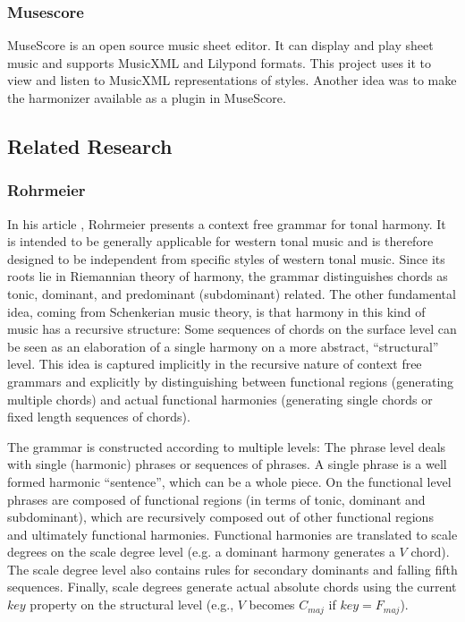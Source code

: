 \subsubsection{Musescore}

MuseScore \cite{musescore} is an open source music sheet editor.
It can display and play sheet music and supports MusicXML and Lilypond formats.
This project uses it to view and listen to MusicXML representations of styles.
Another idea was to make the harmonizer available as a plugin in MuseScore.

\subsection{Related Research}

\subsubsection{Rohrmeier}

In his article \autocite{rohrmeier_towards_2011}, Rohrmeier presents a context free grammar for tonal harmony.
It is intended to be generally applicable for western tonal music and is therefore designed to be independent from specific styles of western tonal music.
Since its roots lie in Riemannian theory of harmony, the grammar distinguishes chords as tonic, dominant, and predominant (subdominant) related.
The other fundamental idea, coming from Schenkerian music theory, is that harmony in this kind of music has a recursive structure:
Some sequences of chords on the surface level can be seen as an elaboration of a single harmony on a more abstract, ``structural'' level.
This idea is captured implicitly in the recursive nature of context free grammars and explicitly by distinguishing between functional regions (generating multiple chords) and actual functional harmonies (generating single chords or fixed length sequences of chords).

The grammar is constructed according to multiple levels:
The phrase level deals with single (harmonic) phrases or sequences of phrases.
A single phrase is a well formed harmonic ``sentence'', which can be a whole piece.
On the functional level phrases are composed of functional regions (in terms of tonic, dominant and subdominant), which are recursively composed out of other functional regions and ultimately functional harmonies.
Functional harmonies are translated to scale degrees on the scale degree level (e.g. a dominant harmony generates a $V$ chord).
The scale degree level also contains rules for secondary dominants and falling fifth sequences.
Finally, scale degrees generate actual absolute chords using the current $key$ property on the structural level (e.g., $V$ becomes $C_{maj}$ if $key = F_{maj}$).

